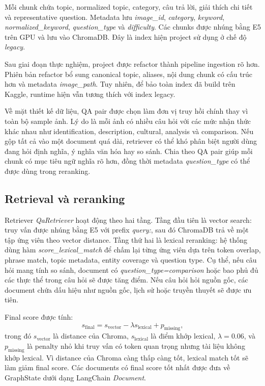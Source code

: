 \documentclass[11pt]{article}
\begin{document}
Mỗi chunk chứa topic, normalized topic, category, câu trả lời, giải thích chi tiết và representative question. Metadata lưu \textit{image\_id}, \textit{category}, \textit{keyword}, \textit{normalized\_keyword}, \textit{question\_type} và \textit{difficulty}. Các chunks được nhúng bằng E5 trên GPU và lưu vào ChromaDB. Đây là index hiện project sử dụng ở chế độ \textit{legacy}.

Sau giai đoạn thực nghiệm, project được refactor thành pipeline ingestion rõ hơn. Phiên bản refactor bổ sung canonical topic, aliases, nội dung chunk có cấu trúc hơn và metadata \textit{image\_path}. Tuy nhiên, để bảo toàn index đã build trên Kaggle, runtime hiện vẫn tương thích với index legacy.

Về mặt thiết kế dữ liệu, QA pair được chọn làm đơn vị truy hồi chính thay vì toàn bộ sample ảnh. Lý do là mỗi ảnh có nhiều câu hỏi với các mức nhận thức khác nhau như identification, description, cultural, analysis và comparison. Nếu gộp tất cả vào một document quá dài, retriever có thể khó phân biệt người dùng đang hỏi định nghĩa, ý nghĩa văn hóa hay so sánh. Chia theo QA pair giúp mỗi chunk có mục tiêu ngữ nghĩa rõ hơn, đồng thời metadata \textit{question\_type} có thể được dùng trong reranking.

\subsection{Retrieval và reranking}

Retriever \textit{QaRetriever} hoạt động theo hai tầng. Tầng đầu tiên là vector search: truy vấn được nhúng bằng E5 với prefix \textit{query:}, sau đó ChromaDB trả về một tập ứng viên theo vector distance. Tầng thứ hai là lexical reranking: hệ thống dùng hàm \textit{score\_lexical\_match} để chấm lại từng ứng viên dựa trên token overlap, phrase match, topic metadata, entity coverage và question type. Cụ thể, nếu câu hỏi mang tính so sánh, document có \textit{question\_type=comparison} hoặc bao phủ đủ các thực thể trong câu hỏi sẽ được tăng điểm. Nếu câu hỏi hỏi nguồn gốc, các document chứa dấu hiệu như nguồn gốc, lịch sử hoặc truyền thuyết sẽ được ưu tiên.

Final score được tính:
\begin{equation}
s_{\text{final}} = s_{\text{vector}} - \lambda s_{\text{lexical}} + p_{\text{missing}},
\end{equation}
trong đó \(s_{\text{vector}}\) là distance của Chroma, \(s_{\text{lexical}}\) là điểm khớp lexical, \(\lambda=0.06\), và \(p_{\text{missing}}\) là penalty nhỏ khi truy vấn có token quan trọng nhưng tài liệu không khớp lexical. Vì distance của Chroma càng thấp càng tốt, lexical match tốt sẽ làm giảm final score. Các documents có final score tốt nhất được đưa về GraphState dưới dạng LangChain \textit{Document}.
\end{document}
